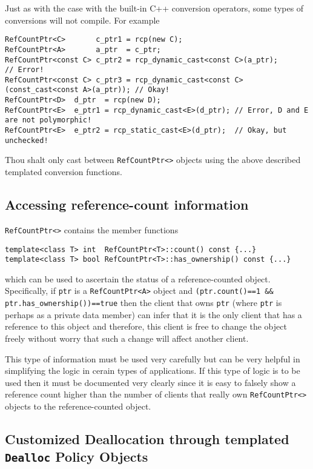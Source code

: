 %
Just as with the case with the built-in C++ conversion operators, some
types of conversions will not compile.  For example
%
{\scriptsize\begin{verbatim}
RefCountPtr<C>       c_ptr1 = rcp(new C);
RefCountPtr<A>       a_ptr  = c_ptr;
RefCountPtr<const C> c_ptr2 = rcp_dynamic_cast<const C>(a_ptr);                      // Error!
RefCountPtr<const C> c_ptr3 = rcp_dynamic_cast<const C>(const_cast<const A>(a_ptr)); // Okay!
RefCountPtr<D>  d_ptr  = rcp(new D);
RefCountPtr<E>  e_ptr1 = rcp_dynamic_cast<E>(d_ptr); // Error, D and E are not polymorphic!
RefCountPtr<E>  e_ptr2 = rcp_static_cast<E>(d_ptr);  // Okay, but unchecked!
\end{verbatim}}

\begin{commandment}
Thou shalt only cast between \texttt{RefCountPtr<>} objects
using the above described templated conversion functions.
\end{commandment}

%
\subsection{Accessing reference-count information}
%

\texttt{RefCountPtr<>} contains the member functions
%
{\scriptsize\begin{verbatim}
template<class T> int  RefCountPtr<T>::count() const {...}
template<class T> bool RefCountPtr<T>::has_ownership() const {...}
\end{verbatim}}
%
\noindent{}which can be used to ascertain the status of a reference-counted
object.  Specifically, if \texttt{ptr} is a \texttt{RefCountPtr<A>}
object and \texttt{(ptr.count()==1 \&\& ptr.has\_ownership())==true}
then the client that owns \texttt{ptr} (where \texttt{ptr} is perhaps
as a private data member) can infer that it is the only client that
has a reference to this object and therefore, this client is free to
change the object freely without worry that such a change will affect
another client.

This type of information must be used very carefully but can be very
helpful in simplifying the logic in cerain types of applications. If
this type of logic is to be used then it must be documented very
clearly since it is easy to falsely show a reference count higher than
the number of clients that really own \texttt{RefCountPtr<>} objects to
the reference-counted object.

%
\subsection{Customized Deallocation through templated \texttt{Dealloc} Policy Objects}
%

